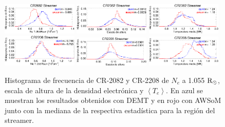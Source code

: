 \documentclass[baaa]{baaa}
\begin{document}
\begin{figure}
  \centering
  \includegraphics[width=0.32\textwidth]{figuras/proceeding_2082_demt_awsom_streamer_ne_1055.eps}
  \includegraphics[width=0.32\textwidth]{figuras/proceeding_2082_demt_awsom_streamer_lambda_n.eps}  
  \includegraphics[width=0.32\textwidth]{figuras/proceeding_2082_demt_awsom_streamer_Tm.eps}\\
  \includegraphics[width=0.32\textwidth]{figuras/proceeding_2208_demt_awsom_streamer_ne_1055.eps}
  \includegraphics[width=0.32\textwidth]{figuras/proceeding_2208_demt_awsom_streamer_lambda_n.eps}
  \includegraphics[width=0.32\textwidth]{figuras/proceeding_2208_demt_awsom_streamer_Tm.eps}
  \caption{Histograma de frecuencia de CR-2082 y CR-2208 de $N_e$ a 1.055 ${\rm R_\odot}$, escala de altura de la densidad electrónica y $\left<T_e\right>$. En azul se muestran los resultados obtenidos con DEMT y en rojo con AWSoM junto con la mediana de la respectiva estadística para la región del streamer.}
  \label{fig-histos}
\end{figure}
\end{document}
